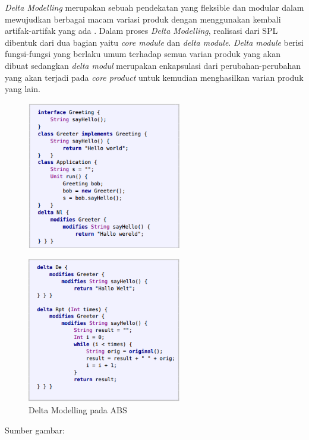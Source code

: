 \noindent
\textit{Delta Modelling} merupakan sebuah pendekatan yang fleksible dan modular dalam mewujudkan berbagai macam variasi produk dengan menggunakan kembali artifak-artifak yang ada \citep{hahnle2013hats}. Dalam proses \textit{Delta Modelling}, realisasi dari SPL dibentuk dari dua bagian yaitu \textit{core module} dan \textit{delta module}. \textit{Delta module} berisi fungsi-fungsi yang berlaku umum terhadap semua varian produk yang akan dibuat sedangkan \textit{delta modul} merupakan enkapsulasi dari perubahan-perubahan yang akan terjadi pada \textit{core product} untuk kemudian menghasilkan varian produk yang lain. \\

\begin{figure}
    \centering
    \includegraphics[width=0.6\textwidth]
        {img/delta-modelling-1.png}
\end{figure}

\begin{figure}
    \centering
    \includegraphics[width=0.6\textwidth]
        {img/delta-modelling-2.png}
    \caption{Delta Modelling pada ABS}
\end{figure}\vspace{-0.8cm}
\begin{center}
{\small Sumber gambar: \citep{clarke2012variability}}
\end{center}